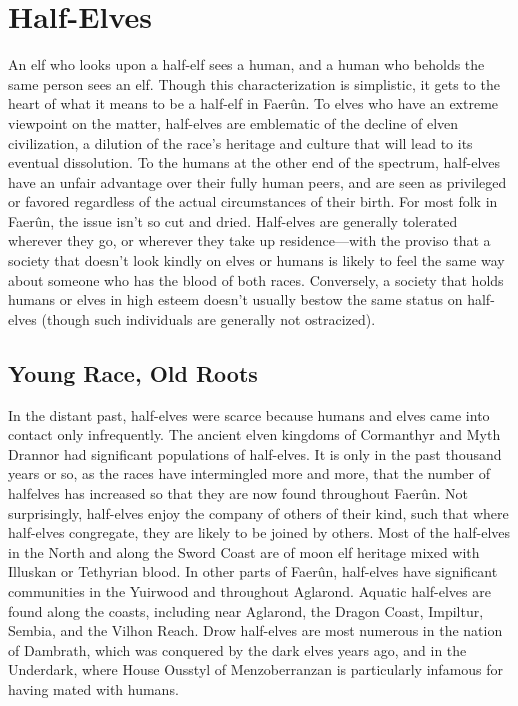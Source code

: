 \documentclass[10pt,a4paper,twoside,twocolumn,openany,bg=print,nodeprecatedcode]{dndbook}
\begin{document}
\section{Half-Elves}
An elf who looks upon a half-elf sees a human, and a human who beholds the same person sees an elf. Though this characterization is simplistic, it gets to the heart of what it means to be a half-elf in Faerûn.
To elves who have an extreme viewpoint on the matter, half-elves are emblematic of the decline of elven civilization, a dilution of the race's heritage and culture that will lead to its eventual dissolution. To the humans at the other end of the spectrum, half-elves have an unfair advantage over their fully human peers, and are seen as privileged or favored regardless of the actual circumstances of their birth.
For most folk in Faerûn, the issue isn't so cut and dried. Half-elves are generally tolerated wherever they go, or wherever they take up residence—with the proviso that a society that doesn't look kindly on elves or humans is likely to feel the same way about someone who has the blood of both races. Conversely, a society that holds humans or elves in high esteem doesn't usually bestow the same status on half-elves (though such individuals are generally not ostracized).
\subsection{Young Race, Old Roots}
In the distant past, half-elves were scarce because humans and elves came into contact only infrequently. The ancient elven kingdoms of Cormanthyr and Myth Drannor had significant populations of half-elves. It is only in the past thousand years or so, as the races have intermingled more and more, that the number of halfelves has increased so that they are now found throughout Faerûn.
Not surprisingly, half-elves enjoy the company of others of their kind, such that where half-elves congregate, they are likely to be joined by others. Most of the half-elves in the North and along the Sword Coast are of moon elf heritage mixed with Illuskan or Tethyrian blood. In other parts of Faerûn, half-elves have significant communities in the Yuirwood and throughout Aglarond. Aquatic half-elves are found along the coasts, including near Aglarond, the Dragon Coast, Impiltur, Sembia, and the Vilhon Reach. Drow half-elves are most numerous in the nation of Dambrath, which was conquered by the dark elves years ago, and in the Underdark, where House Ousstyl of Menzoberranzan is particularly infamous for having mated with humans.
\end{document}
